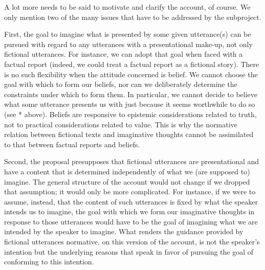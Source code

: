 A lot more needs to be said to motivate and clarify the account, of course. We only mention two of the many issues that have to be addressed by the subproject.

First, the goal to imagine what is presented by some given utterance(s) can be pursued with regard to any utterances with a presentational make-up, not only fictional utterances. For instance, we can adopt that goal when faced with a factual report (indeed, we could treat a factual report as a fictional story). There is no such flexibility when the attitude concerned is belief. We cannot choose the goal with which to form our beliefs, nor can we deliberately determine the constraints under which to form them. In particular, we cannot decide to believe what some utterance presents us with just because it seems worthwhile to do so (see * above). Beliefs are responsive to epistemic considerations related to truth, not to practical considerations related to value. This is why the normative relation between fictional texts and imaginative thoughts cannot be assimilated to that between factual reports and beliefs.

Second, the proposal presupposes that fictional utterances are presentational and have a content that is determined independently of what we (are supposed to) imagine. The general structure of the account would not change if we dropped that assumption; it would only be more complicated. For instance, if we were to assume, instead, that the content of such utterances is fixed by what the speaker intends us to imagine, the goal with which we form our imaginative thoughts in response to those utterances would have to be the goal of imagining what we are intended by the speaker to imagine. What renders the guidance provided by fictional utterances normative, on this version of the account, is not the speaker's intention but the underlying reasons that speak in favor of pursuing the goal of conforming to this intention.


